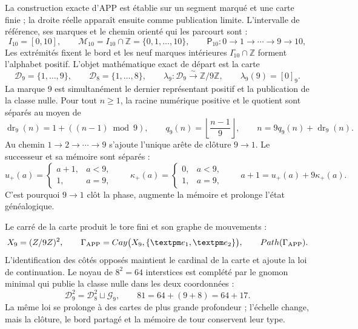 La construction exacte d'APP est établie sur un segment marqué et une
carte finie ; la droite réelle apparaît ensuite comme publication limite. L'intervalle
de référence, ses marques et le chemin orienté qui les parcourt sont :
\begin{equation}
I_{10}=[0,10],\qquad
\mathcal M_{10}=I_{10}\cap\mathbb Z=\{0,1,\ldots,10\},
\qquad
\mathsf P_{10}:0\longrightarrow1\longrightarrow\cdots
\longrightarrow9\longrightarrow10,
\label{p12-83-c3-s1:eq:app-marked-segment}
\end{equation}
Les extrémités fixent le bord et les neuf marques intérieures
\(I_{10}^{\circ}\cap\mathbb Z\) forment l'alphabet positif. L'objet
mathématique exact de départ est la carte
\begin{equation}
\mathcal D_9=\{1,\ldots,9\},
\qquad \mathcal D_8=\{1,\ldots,8\},
\qquad
\lambda_9:\mathcal D_9\xrightarrow{\sim}\mathbb Z/9\mathbb Z,
\qquad \lambda_9(9)=[0]_9.
\label{p12-83-c3-s1:eq:app-positive-chart}
\end{equation}
La marque \(9\) est simultanément le dernier représentant positif et la
publication de la classe nulle. Pour tout \(n\geq1\), la racine numérique positive et
le quotient sont séparés au moyen de
\begin{equation}
\operatorname{dr}_9(n)=1+((n-1)\bmod9),
\qquad q_9(n)=\left\lfloor\frac{n-1}{9}\right\rfloor,
\qquad n=9q_9(n)+\operatorname{dr}_9(n).
\label{p12-83-c3-s1:eq:positive-digital-root-carry}
\end{equation}
Au chemin \(1\to2\to\cdots\to9\) s'ajoute
l'unique arête de clôture \(9\to1\). Le successeur et sa mémoire sont séparés :
\begin{equation}
u_+(a)=\begin{cases}a+1,&a<9,\\1,&a=9,\end{cases}
\qquad
\kappa_+(a)=\begin{cases}0,&a<9,\\1,&a=9,\end{cases}
\qquad a+1=u_+(a)+9\kappa_+(a).
\label{p12-83-c3-s1:eq:app-successor-carry}
\end{equation}
C'est pourquoi \(9\to1\) clôt la phase, augmente la mémoire et prolonge l'état
généalogique.

Le carré de la carte produit le tore fini et son graphe de mouvements :
\begin{equation}
X_9=(\mathbb Z/9\mathbb Z)^2,
\qquad
\Gamma_{\rm APP}=\operatorname{Cay}
\bigl(X_9,\{\pm e_1,\pm e_2\}\bigr),
\qquad
\operatorname{Path}(\Gamma_{\rm APP}).
\label{p12-83-c3-s1:eq:app-cayley-torus}
\end{equation}
L'identification des côtés opposés maintient le cardinal de la carte et ajoute
la loi de continuation. Le noyau de \(8^2=64\) interstices est complété par le gnomon
minimal qui publie la classe nulle dans les deux coordonnées :
\begin{equation}
\mathcal D_9^2=\mathcal D_8^2\sqcup\mathcal G_9,
\qquad
81=64+(9+8)=64+17.
\label{p12-83-c3-s1:eq:app-gnomon-public}
\end{equation}
La même loi se prolonge à des cartes de plus grande profondeur ; l'échelle change,
mais la clôture, le bord partagé et la mémoire de tour conservent leur type.

